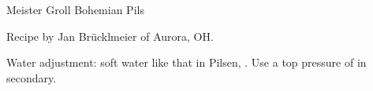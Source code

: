 \begin{recipe}{Meister Groll Bohemian Pils} %

\begin{aboutblock}
Recipe by Jan Brücklmeier of Aurora, OH. \sourceaha
\end{aboutblock}


\begin{methodandtiming}
 
\begin{mashsteps}
\end{mashsteps}

\begin{fermentationsteps}
\end{fermentationsteps}

\begin{directions}
Water adjustment: soft water like that in Pilsen, .
Use a top pressure of  in secondary.
\end{directions}

\end{methodandtiming}

\recipebreak

\begin{ingredientsblock}

\begin{malts}
\end{malts}

\begin{hops}
\end{hops}


\end{ingredientsblock}

\end{recipe}
